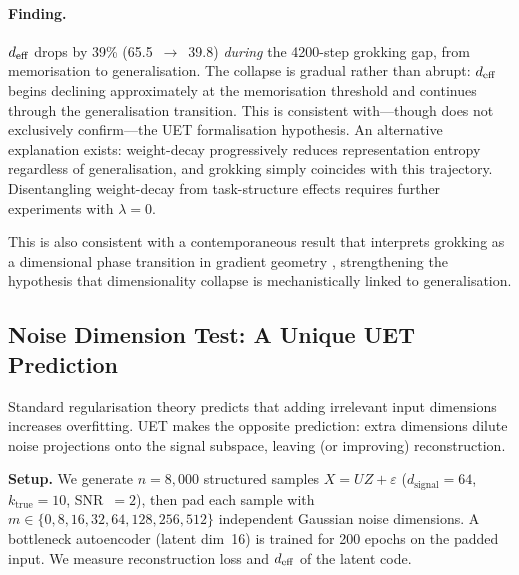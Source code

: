 \paragraph{Finding.}
$d_{\mathrm{eff}}$ drops by 39\% (65.5~$\to$~39.8) \emph{during} the 4200-step grokking
gap, from memorisation to generalisation.
The collapse is gradual rather than abrupt: $d_{\mathrm{eff}}$ begins declining
approximately at the memorisation threshold and continues through the
generalisation transition.
This is consistent with---though does not exclusively confirm---the
UET formalisation hypothesis.
An alternative explanation exists: weight-decay progressively reduces
representation entropy regardless of generalisation, and grokking simply coincides with
this trajectory. Disentangling weight-decay from task-structure effects
requires further experiments with $\lambda=0$.

This is also consistent with a contemporaneous result that interprets grokking
as a dimensional phase transition in gradient geometry
\citep{grokking_dim_transition_2026}, strengthening the hypothesis that
dimensionality collapse is mechanistically linked to generalisation.

\subsection{Noise Dimension Test: A Unique UET Prediction}
\label{sec:noise-dim}

Standard regularisation theory predicts that adding irrelevant input dimensions
increases overfitting. UET makes the opposite prediction: extra dimensions dilute
noise projections onto the signal subspace, leaving (or improving) reconstruction.

\textbf{Setup.}
We generate $n=8{,}000$ structured samples $X = U Z + \varepsilon$
($d_\text{signal}=64$, $k_\text{true}=10$, SNR~$=2$), then pad each sample with
$m \in \{0, 8, 16, 32, 64, 128, 256, 512\}$ independent Gaussian noise dimensions.
A bottleneck autoencoder (latent dim~16) is trained for 200 epochs on the padded input.
We measure reconstruction loss and $d_{\mathrm{eff}}$ of the latent code.

